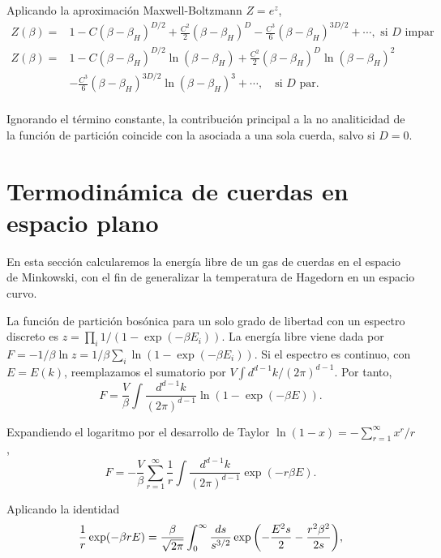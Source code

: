 Aplicando la aproximación Maxwell-Boltzmann $Z=e^z$,
\begin{equation}
  \begin{aligned}
   Z(\beta)= &1-C(\beta-\beta_H)^{D/2} +\frac{C^2}{2}(\beta-\beta_H)^D-\frac{C^3}{6}(\beta-\beta_H)^{3D/2}+\cdots, \text{ si $D$ impar}\\
   Z(\beta)= &1-C(\beta-\beta_H)^{D/2}\ln(\beta-\beta_H) +\frac{C^2}{2}(\beta-\beta_H)^D\ln(\beta-\beta_H) ^2\\
         &-\frac{C^3}{6}(\beta-\beta_H)^{3D/2}\ln(\beta-\beta_H)^3 +\cdots, \quad \text{si $D$ par}.\\
  \end{aligned}
\end{equation}

Ignorando el término constante, la contribución principal a la no analiticidad de la función de partición coincide
con la asociada a una sola cuerda, salvo si $D=0$.


\section{Termodinámica de cuerdas en espacio plano}

En esta sección calcularemos la energía libre de un gas de cuerdas en el espacio de Minkowski,
con el fin de generalizar la temperatura de Hagedorn en un espacio curvo.

La función de partición bosónica para un solo grado de libertad con un espectro discreto es $z=\prod_i 1/(1-\exp(-\beta E_i))$.
La energía libre viene dada por $F=-1/\beta \ln z=1/\beta\sum_i \ln(1-\exp(-\beta E_i))$.
Si el espectro es continuo, con $E=E(k)$, reemplazamos el sumatorio por $V\int d^{d-1}k/(2\pi)^{d-1}$. Por tanto,
\begin{equation}
  F=\frac{V}{\beta}\int \frac{d^{d-1}k}{(2\pi)^{d-1}}\ln(1-\exp(-\beta E)).
\end{equation}

Expandiendo el logaritmo por el desarrollo de Taylor $\ln(1-x)=-\sum^\infty_{r=1} x^r/r$,
\begin{equation}
  F=-\frac{V}{\beta}\sum^\infty_{r=1} \frac 1 r\int \frac{d^{d-1}k}{(2\pi)^{d-1}}\exp(-r\beta E).
\end{equation}

Aplicando la identidad
\begin{equation}
  \frac 1 r \exp(-\beta r E)=\frac{\beta}{\sqrt{2\pi}}\int_0^\infty \frac{ds}{s^{3/2}}\exp\qty(-\frac{E^2s}{2}-\frac{r^2\beta^2}{2s}),
\end{equation}

